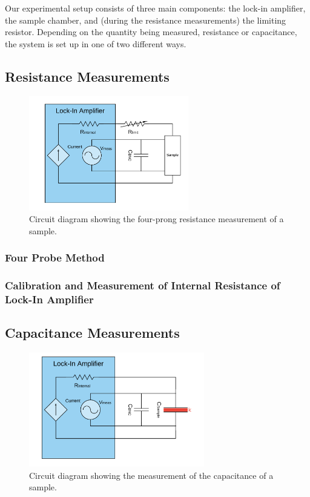 \documentclass[%
 reprint,
 amsmath,amssymb,
 aps,
 pra,
]{revtex4-1}
\begin{document}
Our experimental setup consists of three main components: the lock-in amplifier, the sample chamber, and (during the resistance measurements) the limiting resistor. Depending on the quantity being measured, resistance or capacitance, the system is set up in one of two different ways.

\subsection{Resistance Measurements}

\begin{figure}[H]
	\centering
	\includegraphics[height=5cm]{diagram_res.png}
	\caption{Circuit diagram showing the four-prong resistance measurement of a sample.}
	\label{fig:ResistanceMeasurements}
\end{figure}

\subsubsection{Four Probe Method}

\subsubsection{Calibration and Measurement of Internal Resistance of Lock-In Amplifier}

\subsection{Capacitance Measurements}

\begin{figure}[H]
	\centering
	\includegraphics[height=5cm]{diagram_cap.png}
	\caption{Circuit diagram showing the measurement of the capacitance of a sample.}
	\label{fig:CapMeasurements}
\end{figure}
\end{document}
